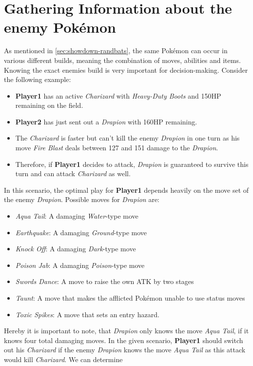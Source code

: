 \section{Gathering Information about the enemy Pokémon}
\label{sec:builds-randbats}
As mentioned in \ref{sec:showdown-randbats}, the same Pokémon can occur in various different builds, meaning the combination
of moves, abilities and items. Knowing the exact enemies build is very important for decision-making. Consider the following
example: 
\begin{itemize}
	\item \textbf{Player1} has an active \textit{Charizard} with \textit{Heavy-Duty Boots} and 150\ac{HP} remaining on the field.
	\item \textbf{Player2} has just sent out a \textit{Drapion} with 160\ac{HP} remaining.
	\item The \textit{Charizard} is faster but can't kill the enemy \textit{Drapion} in one turn as his move 
	\textit{Fire Blast} deals between 127 and 151 damage to the \textit{Drapion}. 
	\item Therefore, if \textbf{Player1} decides to attack, \textit{Drapion} is guaranteed to survive this turn
	and can attack \textit{Charizard} as well.
\end{itemize}
In this scenario, the optimal play for \textbf{Player1} depends heavily on the move set of the enemy \textit{Drapion}.
Possible moves for \textit{Drapion} are:
\begin{itemize}
	\item \textit{Aqua Tail}: A damaging \textit{Water}-type move
	\item \textit{Earthquake}: A damaging \textit{Ground}-type move
	\item \textit{Knock Off}: A damaging \textit{Dark}-type move
	\item \textit{Poison Jab}: A damaging \textit{Poison}-type move
	\item \textit{Swords Dance}: A move to raise the own \ac{ATK} by two stages
	\item \textit{Taunt}: A move that makes the afflicted Pokémon unable to use status moves
	\item \textit{Toxic Spikes}: A move that sets an entry hazard.
\end{itemize}
Hereby it is important to note, that \textit{Drapion} only knows the move \textit{Aqua Tail}, if it knows four total 
damaging moves. In the given scenario, \textbf{Player1} should switch out his \textit{Charizard} if the enemy
\textit{Drapion} knows the move \textit{Aqua Tail} as this attack would kill \textit{Charizard}. We can determine 
